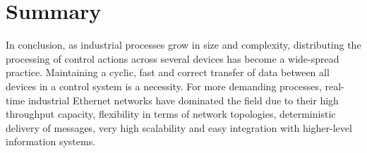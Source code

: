 \section{Summary} \label{sec:sota-summary}

In conclusion, as industrial processes grow in size and complexity, distributing the processing of control actions across several devices has become a wide-spread practice.
Maintaining a cyclic, fast and correct transfer of data between all devices in a control system is a necessity.
For more demanding processes, real-time industrial Ethernet networks have dominated the field due to their high throughput capacity, flexibility in terms of network topologies, deterministic delivery of messages, very high scalability and easy integration with higher-level information systems.
